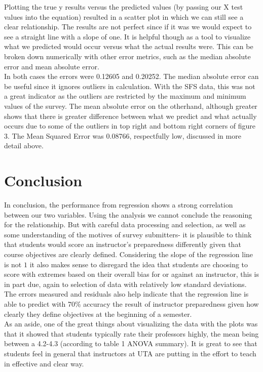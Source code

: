 \documentclass[10pt]{report}
\begin{document}
Plotting the true y results versus the predicted values (by passing our X test values into the equation) resulted in a scatter plot
in which we can still see a clear relationship. The results are not perfect since if it was we would expect to see a straight line
with a slope of one. It is helpful though as a tool to visualize what we predicted would occur versus what the actual results were.
This can be broken down numerically with other error metrics, such as the median absolute error and mean absolute error. \\
In both cases the errors were 0.12605 and 0.20252. The median absolute error can be useful since it ignores outliers in calculation.
With the SFS data, this was not a great indicator as the outliers are restricted by the maximum and minimum values of the survey.
The mean absolute error on the otherhand, although greater shows that there is greater difference between what we predict and what actually
occurs due to some of the outliers in top right and bottom right corners of figure 3.
The Mean Squared Error was 0.08766, respectfully low, discussed in more detail above.



\section*{Conclusion}

In conclusion, the performance from regression shows a strong correlation between our two variables. Using the analysis we cannot conclude
the reasoning for the relationship. But with careful data processing and selection, as well as some understanding of the motives of survey 
submitters- it is plausible to think that students would score an instructor's preparedness differently given that course objectives are
clearly defined. Considering the slope of the regression line is not $1$ it also makes sense to disregard the idea that students are choosing
to score with extremes based on their overall bias for or against an instructor, this is in part due, again to selection of data with relatively
low standard deviations. The errors measured and residuals also help indicate that the regression line is able to predict with 70\% accuracy the 
result of instructor preparedness given how clearly they define objectives at the beginning of a semester. \\
As an aside, one of the great things about visualizing the data with the plots was that it showed that students typically rate their professors
highly, the mean being between a 4.2-4.3 (according to table 1 ANOVA summary). It is great to see that students feel in general that instructors
at UTA are putting in the effort to teach in effective and clear way.
\end{document}
